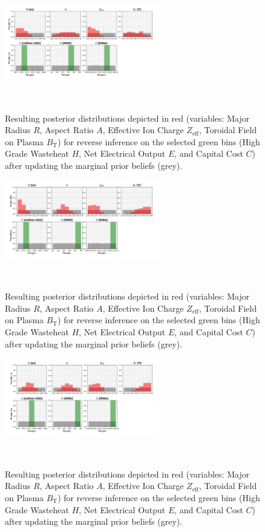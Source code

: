 \begin{figure}[!b]
    \centering
    \includegraphics[width=0.6\textwidth]{figures/TE_results/march_data/config(57)_3outputs_v2_5.png}
    \caption{Resulting posterior distributions depicted in red (variables: Major Radius $R$, Aspect Ratio $A$, Effective Ion Charge $Z_{\text{eff}}$, Toroidal Field on Plasma $B_{\text{T}}$) for reverse inference on the selected green bins (High Grade Wasteheat $H$, Net Electrical Output $E$, and  Capital Cost $C$) after updating the marginal prior beliefs (grey).}~\label{fig:config(57)_3outputs_V2_5}
\end{figure}

\begin{figure}[!b]
    \centering
    \includegraphics[width=0.6\textwidth]{figures/TE_results/march_data/config(57)_3outputs_V2_6.png}
    \caption{Resulting posterior distributions depicted in red (variables: Major Radius $R$, Aspect Ratio $A$, Effective Ion Charge $Z_{\text{eff}}$, Toroidal Field on Plasma $B_{\text{T}}$) for reverse inference on the selected green bins (High Grade Wasteheat $H$, Net Electrical Output $E$, and  Capital Cost $C$) after updating the marginal prior beliefs (grey).}~\label{fig:config(57)_3outputs_V2_6}
\end{figure}

\begin{figure}[!b]
    \centering
    \includegraphics[width=0.6\textwidth]{figures/TE_results/march_data/config(57)_3outputs_V2_7.png}
    \caption{Resulting posterior distributions depicted in red (variables: Major Radius $R$, Aspect Ratio $A$, Effective Ion Charge $Z_{\text{eff}}$, Toroidal Field on Plasma $B_{\text{T}}$) for reverse inference on the selected green bins (High Grade Wasteheat $H$, Net Electrical Output $E$, and  Capital Cost $C$) after updating the marginal prior beliefs (grey).}~\label{fig:config(57)_3outputs_V2_7}
\end{figure}

